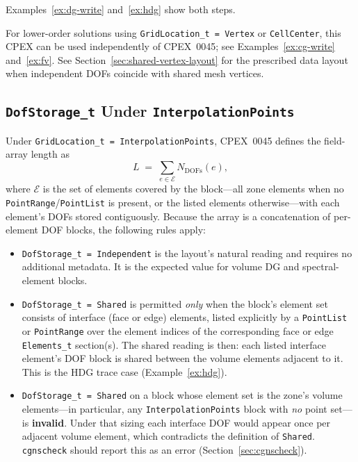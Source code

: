 \documentclass[11pt,letterpaper]{article}
\begin{document}
Examples~\ref{ex:dg-write} and~\ref{ex:hdg} show both steps.

For lower-order solutions using \texttt{GridLocation\_t = Vertex} or
\texttt{CellCenter}, this CPEX can be used independently of CPEX~0045;
see Examples~\ref{ex:cg-write} and~\ref{ex:fv}.
See Section~\ref{sec:shared-vertex-layout} for the prescribed data
layout when independent DOFs coincide with shared mesh vertices.

\subsection{\texttt{DofStorage\_t} Under \texttt{InterpolationPoints}}
\label{sec:dofstorage-interp}

Under \texttt{GridLocation\_t = InterpolationPoints}, CPEX~0045
defines the field-array length as
\[
  L \;=\; \sum_{e \in \mathcal{E}} N_{\mathrm{DOFs}}(e),
\]
where $\mathcal{E}$ is the set of elements covered by the block---all
zone elements when no \texttt{PointRange}/\texttt{PointList} is
present, or the listed elements otherwise---with each element's DOFs
stored contiguously.  Because the array is a concatenation of
per-element DOF blocks, the following rules apply:

\begin{itemize}[leftmargin=2em]
\item \texttt{DofStorage\_t = Independent} is the layout's natural
  reading and requires no additional metadata.  It is the expected
  value for volume DG and spectral-element blocks.

\item \texttt{DofStorage\_t = Shared} is permitted \emph{only} when
  the block's element set consists of interface (face or edge)
  elements, listed explicitly by a \texttt{PointList} or
  \texttt{PointRange} over the element indices of the corresponding
  face or edge \texttt{Elements\_t} section(s).  The shared reading is
  then: each listed interface element's DOF block is shared between the
  volume elements adjacent to it.  This is the HDG trace case
  (Example~\ref{ex:hdg}).

\item \texttt{DofStorage\_t = Shared} on a block whose element set is
  the zone's volume elements---in particular, any
  \texttt{InterpolationPoints} block with \emph{no} point set---is
  \textbf{invalid}.  Under that sizing each interface DOF would appear
  once per adjacent volume element, which contradicts the definition of
  \texttt{Shared}.  \texttt{cgnscheck} should report this as an error
  (Section~\ref{sec:cgnscheck}).
\end{itemize}
\end{document}
